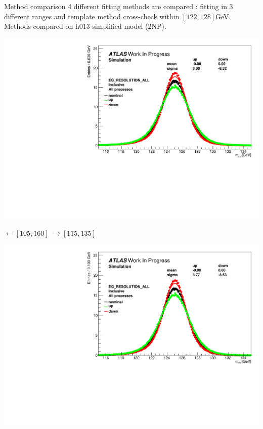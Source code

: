\begin{frame}{Method comparison}
  4 different fitting methods are compared : fitting in 3 different ranges and template method cross-check within $[122, 128]$GeV.
  Methods compared on h013 simplified model (2NP).
  
  \begin{minipage}{0.42\linewidth}
    \includegraphics[width=\linewidth]{Figures/h013_EG_RESOLUTION_ALL_0_105160.pdf}
  \end{minipage}
  \hfill
  \begin{minipage}{0.14\linewidth}
    $\leftarrow [105,160]$
    $\rightarrow [115,135]$
    \end{minipage}
  \hfill
  \begin{minipage}{0.42\linewidth}
    \includegraphics[width=\linewidth]{Figures/h013_EG_RESOLUTION_ALL_0_115135.pdf}

\end{minipage}
\end{frame}
